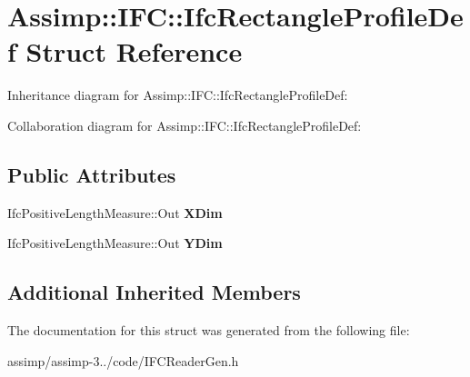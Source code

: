 \hypertarget{struct_assimp_1_1_i_f_c_1_1_ifc_rectangle_profile_def}{\section{Assimp\+:\+:I\+F\+C\+:\+:Ifc\+Rectangle\+Profile\+Def Struct Reference}
\label{struct_assimp_1_1_i_f_c_1_1_ifc_rectangle_profile_def}
}


Inheritance diagram for Assimp\+:\+:I\+F\+C\+:\+:Ifc\+Rectangle\+Profile\+Def\+:


Collaboration diagram for Assimp\+:\+:I\+F\+C\+:\+:Ifc\+Rectangle\+Profile\+Def\+:
\subsection*{Public Attributes}
\begin{DoxyCompactItemize}
\item 
\hypertarget{struct_assimp_1_1_i_f_c_1_1_ifc_rectangle_profile_def_abd540b65c7948940329a98963a44cb6c}{Ifc\+Positive\+Length\+Measure\+::\+Out {\bfseries X\+Dim}}\label{struct_assimp_1_1_i_f_c_1_1_ifc_rectangle_profile_def_abd540b65c7948940329a98963a44cb6c}

\item 
\hypertarget{struct_assimp_1_1_i_f_c_1_1_ifc_rectangle_profile_def_a382f6e83bba799e8e0655966f0bea78e}{Ifc\+Positive\+Length\+Measure\+::\+Out {\bfseries Y\+Dim}}\label{struct_assimp_1_1_i_f_c_1_1_ifc_rectangle_profile_def_a382f6e83bba799e8e0655966f0bea78e}

\end{DoxyCompactItemize}
\subsection*{Additional Inherited Members}


The documentation for this struct was generated from the following file\+:\begin{DoxyCompactItemize}
\item 
assimp/assimp-\/3../code/I\+F\+C\+Reader\+Gen.\+h\end{DoxyCompactItemize}
